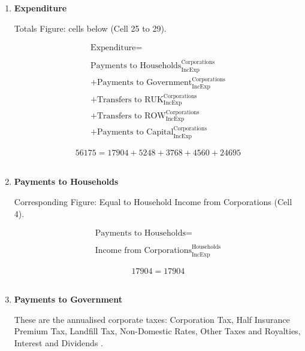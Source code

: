\begin{enumerate}
\item \textbf {Expenditure}

Totals Figure: cells below (Cell 25 to 29).

\begin{equation}
\begin{split}
\text{Expenditure} =  \\ \\
\text{Payments to Households}^\text{Corporations}_\text{IncExp}\\
+\text{Payments to Government}^\text{Corporations}_\text{IncExp}\\
+\text{Transfers to RUK}^\text{Corporations}_\text{IncExp}\\
+\text{Transfers to ROW}^\text{Corporations}_\text{IncExp}\\
+\text{Payments to Capital}^\text{Corporations}_\text{IncExp}
\end{split} \label{eq:2.5.28}
\end{equation}

\begin{equation} \nonumber
56175 = 17904+5248+3768+4560+24695
\end{equation}\\


\item \textbf {Payments to Households}

Corresponding Figure: Equal to Household Income from Corporations (Cell 4).

\begin{equation}
\begin{split}
\text{Payments to Households} =  \\ \\
\text{Income from Corporations}^\text{Households}_\text{IncExp}
\end{split} \label{eq:2.5.29}
\end{equation}

\begin{equation} \nonumber
17904 = 17904
\end{equation}\\


\item \textbf {Payments to Government}

These are the annualised corporate taxes: Corporation Tax, Half Insurance Premium Tax, Landfill Tax, Non-Domestic Rates, Other Taxes and Royalties, Interest and Dividends \cite{ScotGov2013b}.


\end{enumerate}
